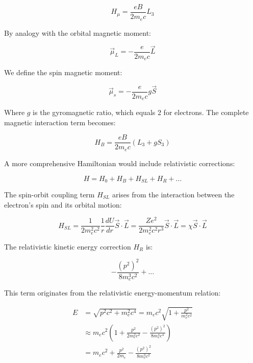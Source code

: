 \documentclass[italian]{HKNdocument}
\begin{document}
\begin{equation}
H_{\mu}=\frac{eB}{2m_e c}L_3
\end{equation}

By analogy with the orbital magnetic moment:

\begin{equation}
\vec{\mu}_L=-\frac{e}{2m_e c}\vec{L}
\end{equation}

We define the spin magnetic moment:

\begin{equation}
\vec{\mu}_s=-\frac{e}{2m_e c}g\vec{S}
\end{equation}

Where $g$ is the gyromagnetic ratio, which equals 2 for electrons. The complete magnetic interaction term becomes:

\begin{equation}
H_B=\frac{eB}{2m_e c}(L_3+gS_3)
\end{equation}

A more comprehensive Hamiltonian would include relativistic corrections:

\begin{equation}
H=H_0+H_B+H_{SL}+H_R+\ldots
\end{equation}

The spin-orbit coupling term $H_{SL}$ arises from the interaction between the electron's spin and its orbital motion:

\begin{equation}
H_{SL}=\frac{1}{2m_e^2c^2}\frac{1}{r}\frac{dU}{dr}\vec{S}\cdot\vec{L}=\frac{Ze^2}{2m_e^2c^2r^3}\vec{S}\cdot\vec{L}=\chi\vec{S}\cdot\vec{L}
\end{equation}

The relativistic kinetic energy correction $H_R$ is:

\begin{equation}
-\frac{(p^2)^2}{8m_e^3c^2}+\ldots
\end{equation}

This term originates from the relativistic energy-momentum relation:

\begin{align}
E &=\sqrt{p^2c^2+m_e^2c^4}=m_ec^2\sqrt{1+\frac{p^2}{m_e^2c^2}}\\
&\approx m_ec^2\left(1+\frac{p^2}{2m_e^2c^2}-\frac{(p^2)^2}{8m_e^4c^4}\right)\\
&=m_ec^2+\frac{p^2}{2m_e}-\frac{(p^2)^2}{8m_e^3c^2}
\end{align}
\end{document}
